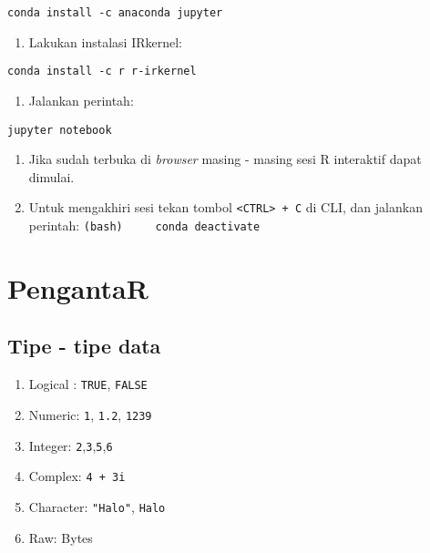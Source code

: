 \documentclass[11pt]{article}
\providecommand{\tightlist}{%
      \setlength{\itemsep}{0pt}\setlength{\parskip}{0pt}}
\begin{document}
\begin{verbatim}
conda install -c anaconda jupyter
\end{verbatim}

\begin{enumerate}
\def\labelenumi{\arabic{enumi}.}
\setcounter{enumi}{5}
\tightlist
\item
  Lakukan instalasi IRkernel:
\end{enumerate}

\begin{verbatim}
conda install -c r r-irkernel
\end{verbatim}

\begin{enumerate}
\def\labelenumi{\arabic{enumi}.}
\setcounter{enumi}{6}
\tightlist
\item
  Jalankan perintah:
\end{enumerate}

\begin{verbatim}
jupyter notebook
\end{verbatim}

\begin{enumerate}
\def\labelenumi{\arabic{enumi}.}
\setcounter{enumi}{7}
\tightlist
\item
  Jika sudah terbuka di \emph{browser} masing - masing sesi R interaktif
  dapat dimulai.
\item
  Untuk mengakhiri sesi tekan tombol
  \texttt{\textless{}CTRL\textgreater{}\ +\ C} di CLI, dan jalankan
  perintah: \texttt{(bash)\ \ \ \ \ conda\ deactivate}
\end{enumerate}

    \hypertarget{pengantar}{%
\section{PengantaR}\label{pengantar}}

    \hypertarget{tipe---tipe-data}{%
\subsection{Tipe - tipe data}\label{tipe---tipe-data}}

    \begin{enumerate}
\def\labelenumi{\arabic{enumi}.}
\tightlist
\item
  Logical : \texttt{TRUE}, \texttt{FALSE}
\item
  Numeric: \texttt{1}, \texttt{1.2}, \texttt{1239}
\item
  Integer: \texttt{2},\texttt{3},\texttt{5},\texttt{6}
\item
  Complex: \texttt{4\ +\ 3i}
\item
  Character: \texttt{"Halo"},
  \texttt{\textquotesingle{}Halo\textquotesingle{}}
\item
  Raw: Bytes
\end{enumerate}
\end{document}
